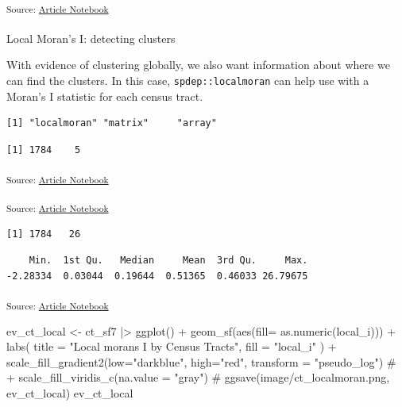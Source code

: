 \documentclass[
  letterpaper,
  DIV=11,
  numbers=noendperiod]{scrartcl}
\makeatletter
\let\oldparagraph\paragraph
\renewcommand{\paragraph}{
    \@ifstar
      \xxxParagraphStar
      \xxxParagraphNoStar
  }
\newcommand{\xxxParagraphStar}[1]{\oldparagraph*{#1}\mbox{}}
\newcommand{\xxxParagraphNoStar}[1]{\oldparagraph{#1}\mbox{}}
\newenvironment{Shaded}{\begin{snugshade}}{\end{snugshade}}
\newcommand{\AttributeTok}[1]{\textcolor[rgb]{0.40,0.45,0.13}{#1}}
\newcommand{\CommentTok}[1]{\textcolor[rgb]{0.37,0.37,0.37}{#1}}
\newcommand{\FunctionTok}[1]{\textcolor[rgb]{0.28,0.35,0.67}{#1}}
\newcommand{\NormalTok}[1]{\textcolor[rgb]{0.00,0.23,0.31}{#1}}
\newcommand{\OtherTok}[1]{\textcolor[rgb]{0.00,0.23,0.31}{#1}}
\newcommand{\SpecialCharTok}[1]{\textcolor[rgb]{0.37,0.37,0.37}{#1}}
\newcommand{\StringTok}[1]{\textcolor[rgb]{0.13,0.47,0.30}{#1}}
\makeatother
\begin{document}
\textsubscript{Source:
\href{https://h-christy.github.io/24-manuscript/index.qmd.html}{Article
Notebook}}

\paragraph{Local Moran's I: detecting
clusters}\label{local-morans-i-detecting-clusters}

With evidence of clustering globally, we also want information about
where we can find the clusters. In this case, \texttt{spdep::localmoran}
can help use with a Moran's I statistic for each census tract.

\begin{verbatim}
[1] "localmoran" "matrix"     "array"     
\end{verbatim}

\begin{verbatim}
[1] 1784    5
\end{verbatim}

\textsubscript{Source:
\href{https://h-christy.github.io/24-manuscript/index.qmd.html}{Article
Notebook}}

\textsubscript{Source:
\href{https://h-christy.github.io/24-manuscript/index.qmd.html}{Article
Notebook}}

\begin{verbatim}
[1] 1784   26
\end{verbatim}

\begin{verbatim}
    Min.  1st Qu.   Median     Mean  3rd Qu.     Max. 
-2.28334  0.03044  0.19644  0.51365  0.46033 26.79675 
\end{verbatim}

\textsubscript{Source:
\href{https://h-christy.github.io/24-manuscript/index.qmd.html}{Article
Notebook}}

\begin{Shaded}
\begin{Highlighting}[]
\NormalTok{ev\_ct\_local }\OtherTok{\textless{}{-}}\NormalTok{ ct\_sf7 }\SpecialCharTok{|\textgreater{}} \FunctionTok{ggplot}\NormalTok{() }\SpecialCharTok{+}
  \FunctionTok{geom\_sf}\NormalTok{(}\FunctionTok{aes}\NormalTok{(}\AttributeTok{fill=} \FunctionTok{as.numeric}\NormalTok{(local\_i))) }\SpecialCharTok{+}
  \FunctionTok{labs}\NormalTok{(}
    \AttributeTok{title =} \StringTok{"Local moran\textquotesingle{}s I by Census Tracts"}\NormalTok{,}
    \AttributeTok{fill =} \StringTok{"local\_i"}
\NormalTok{  ) }\SpecialCharTok{+}
  \FunctionTok{scale\_fill\_gradient2}\NormalTok{(}\AttributeTok{low=}\StringTok{"darkblue"}\NormalTok{, }\AttributeTok{high=}\StringTok{"red"}\NormalTok{,}
  \AttributeTok{transform =} \StringTok{"pseudo\_log"}\NormalTok{)}
\CommentTok{\# +}
  \FunctionTok{scale\_fill\_viridis\_c}\NormalTok{(}\AttributeTok{na.value =} \StringTok{"gray"}\NormalTok{)}
\CommentTok{\# ggsave(\textquotesingle{}image/ct\_localmoran.png\textquotesingle{}, ev\_ct\_local)}
\NormalTok{ev\_ct\_local}
\end{Highlighting}
\end{Shaded}
\end{document}
